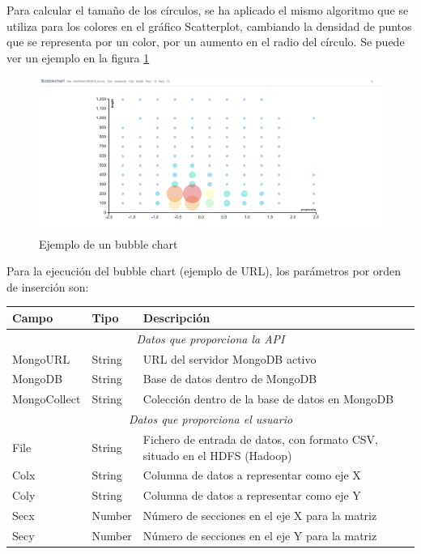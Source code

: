 Para calcular el tamaño de los círculos, se ha aplicado el mismo algoritmo que se utiliza para los colores en el gráfico Scatterplot, cambiando la densidad de puntos que se representa por un color, por un aumento en el radio del círculo.  Se puede ver un ejemplo en la figura \ref{fig:ejemplobubblechart}
\begin{figure}
	\centering
	\includegraphics[width=1\linewidth]{imagenes/ejemplo_bubblechart}
	\caption{Ejemplo de un bubble chart}
	\label{fig:ejemplobubblechart}
\end{figure}

Para la ejecución del bubble chart (ejemplo de URL\footnotemark), los parámetros por orden de inserción son:

\begin{tabular}{|l|l|p{7cm}|}
	\hline 
	\textbf{Campo} & \textbf{Tipo} & \textbf{Descripción} \\ 
	\hline \hline
	\multicolumn{3}{|c|}{\textit{Datos que proporciona la API}} \\
	\hline 
	MongoURL & String & URL del servidor MongoDB activo \\ 
	\hline 
	MongoDB & String & Base de datos dentro de MongoDB \\ 
	\hline 
	MongoCollect& String & Colección dentro de la base de datos en MongoDB \\ 
	\hline \hline
	\multicolumn{3}{|c|}{\textit{Datos que proporciona el usuario}} \\
	\hline 
	File & String & Fichero de entrada de datos, con formato CSV, situado en el HDFS (Hadoop) \\ 
	\hline 
	Colx & String & Columna de datos a representar como eje X \\ 
	\hline 
	Coly & String & Columna de datos a representar como eje Y \\ 
	\hline 
	Secx & Number & Número de secciones en el eje X para la matriz \\ 
	\hline 
	Secy & Number & Número de secciones en el eje Y para la matriz \\ 
	\hline 
\end{tabular} 

